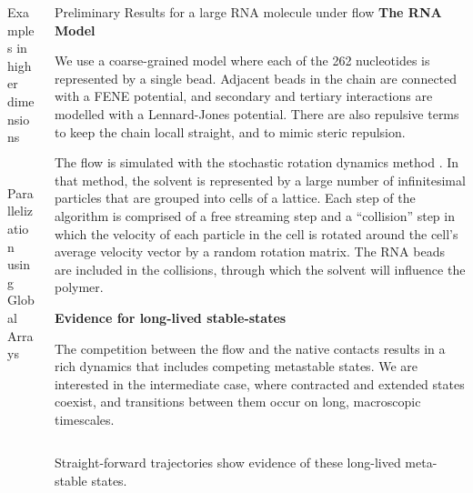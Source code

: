 \documentclass[final]{beamer}
\begin{document}
\begin{columns}[t]
\begin{column}{.33\linewidth}
\begin{block}{Examples in higher dimensions}
\begin{columns}[t]
\begin{column}{.33\linewidth}
\begin{figure}
		  \end{figure}
		\end{column}

	  \end{columns}
        \end{block}
        \begin{block}{Parallelization using Global Arrays}
        \end{block}
      \end{column}
      \begin{column}{.33\linewidth}
        \begin{block}{Preliminary Results for a large RNA molecule under flow}
	  \textbf{The RNA Model}

	  We use a coarse-grained model where each of the 262 nucleotides is represented by a single bead.  Adjacent beads in the chain are connected with a FENE potential, and secondary and tertiary interactions are modelled with a Lennard-Jones potential.  There are also repulsive terms to keep the chain locall straight, and to mimic steric repulsion.

	  \vspace{10 mm}
	  The flow is simulated with the stochastic rotation dynamics method
	  \cite{Malevanets1999,Ihle2001,Lamura2001,Allahyarov2002}.  In that method, the
	  solvent is represented by a large number of infinitesimal particles that are 
	  grouped into cells of a lattice.  Each step of the algorithm is
	  comprised of a free streaming step and a ``collision'' step in which the velocity of each particle in the cell is rotated around the cell's average velocity vector by a random rotation matrix.
	  The RNA beads are included in the collisions, through which the solvent will influence
	  the polymer.
	  \vspace{10 mm}

	  \textbf{Evidence for long-lived stable-states}

	  The competition between the flow and the native contacts results in a rich dynamics that includes competing metastable states.
	  We are interested in the intermediate case, where contracted and extended states coexist, and transitions between them occur on long, macroscopic timescales.

	  \begin{columns}[t]
	    \begin{column}{.35\linewidth}

	      Straight-forward trajectories show evidence of these long-lived meta-stable states.  


\end{column}
\end{columns}
\end{block}
\end{column}
\end{columns}
\end{document}
